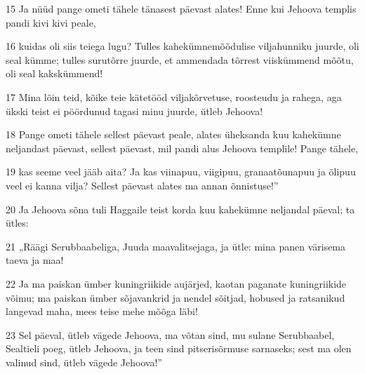 \par 15 Ja nüüd pange ometi tähele tänasest päevast alates! Enne kui Jehoova templis pandi kivi kivi peale,
\par 16 kuidas oli siis teiega lugu? Tulles kahekümnemõõdulise viljahunniku juurde, oli seal kümme; tulles surutõrre juurde, et ammendada tõrrest viiskümmend mõõtu, oli seal kakskümmend!
\par 17 Mina lõin teid, kõike teie kätetööd viljakõrvetuse, roosteudu ja rahega, aga ükski teist ei pöördunud tagasi minu juurde, ütleb Jehoova!
\par 18 Pange ometi tähele sellest päevast peale, alates üheksanda kuu kahekümne neljandast päevast, sellest päevast, mil pandi alus Jehoova templile! Pange tähele,
\par 19 kas seeme veel jääb aita? Ja kas viinapuu, viigipuu, granaatõunapuu ja õlipuu veel ei kanna vilja? Sellest päevast alates ma annan õnnistuse!”
\par 20 Ja Jehoova sõna tuli Haggaile teist korda kuu kahekümne neljandal päeval; ta ütles:
\par 21 „Räägi Serubbaabeliga, Juuda maavalitsejaga, ja ütle: mina panen värisema taeva ja maa!
\par 22 Ja ma paiskan ümber kuningriikide aujärjed, kaotan paganate kuningriikide võimu; ma paiskan ümber sõjavankrid ja nendel sõitjad, hobused ja ratsanikud langevad maha, mees teise mehe mõõga läbi!
\par 23 Sel päeval, ütleb vägede Jehoova, ma võtan sind, mu sulane Serubbaabel, Sealtieli poeg, ütleb Jehoova, ja teen sind pitserisõrmuse sarnaseks; sest ma olen valinud sind, ütleb vägede Jehoova!”




